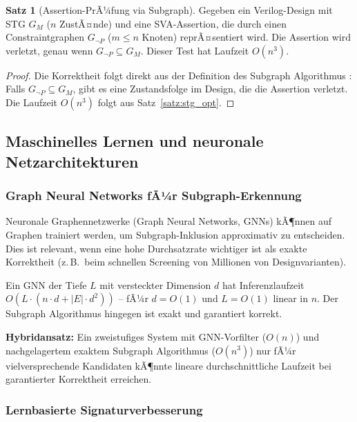﻿\documentclass[a4paper,12pt]{article}
\theoremstyle{definition}
\newtheorem{satz}{Satz}
\begin{document}
\begin{satz}[Assertion-PrÃ¼fung via Subgraph]\label{satz:assertion}
  Gegeben ein Verilog-Design mit STG $G_M$ ($n$ ZustÃ¤nde) und eine
  SVA-Assertion, die durch einen Constraintgraphen $G_{\neg P}$ ($m \leq n$ Knoten)
  reprÃ¤sentiert wird. Die Assertion wird verletzt, genau wenn $G_{\neg P} \subseteq G_M$.
  Dieser Test hat Laufzeit $O(n^3)$.
\end{satz}

\begin{proof}
  Die Korrektheit folgt direkt aus der Definition des Subgraph Algorithmus
  \cite{subgraph2026}: Falls $G_{\neg P} \subseteq G_M$, gibt es eine
  Zustandsfolge im Design, die die Assertion verletzt. Die Laufzeit $O(n^3)$
  folgt aus Satz~\ref{satz:stg_opt}.
\end{proof}

\subsection{Maschinelles Lernen und neuronale Netzarchitekturen}

\subsubsection{Graph Neural Networks fÃ¼r Subgraph-Erkennung}

Neuronale Graphennetzwerke (Graph Neural Networks, GNNs) \cite{schur2022gnn_survey}
kÃ¶nnen auf Graphen trainiert werden, um Subgraph-Inklusion approximativ zu entscheiden.
Dies ist relevant, wenn eine hohe Durchsatzrate wichtiger ist als exakte Korrektheit
(z.\,B.\ beim schnellen Screening von Millionen von Designvarianten).

Ein GNN der Tiefe $L$ mit versteckter Dimension $d$ hat Inferenzlaufzeit
$O(L \cdot (n \cdot d + |E| \cdot d^2))$ -- fÃ¼r $d = O(1)$ und $L = O(1)$ linear in $n$.
Der Subgraph Algorithmus hingegen ist exakt und garantiert korrekt.

\textbf{Hybridansatz:} Ein zweistufiges System mit GNN-Vorfilter ($O(n)$) und
nachgelagertem exaktem Subgraph Algorithmus ($O(n^3)$) nur fÃ¼r vielversprechende
Kandidaten kÃ¶nnte lineare durchschnittliche Laufzeit bei garantierter Korrektheit
erreichen.

\subsubsection{Lernbasierte Signaturverbesserung}
\end{document}
